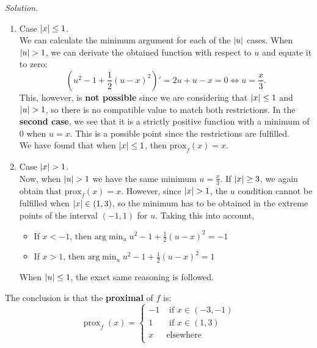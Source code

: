 \documentclass[a4paper]{article}
\DeclarePairedDelimiter\abs{\lvert}{\rvert}%
\newenvironment{solution}
    {\textit{Solution.}\\}
    {}
\begin{document}
\begin{solution}
  \begin{enumerate}
    \item Case \(\abs{x} \leq 1 \).\\

          We can calculate the minimum argument for each of the \(\abs{u}\) cases. When \(\abs{u} > 1\), we can derivate the obtained function with respect to \(u\) and equate it to zero:
          \[
            \left(u^2 - 1 + \frac{1}{2}(u-x)^2\right)' = 2u + u -x = 0 \Longleftrightarrow  u = \frac{x}{3}.
          \]
          This, however, is \textbf{not possible} since we are considering that \(\abs{x} \leq 1\) and \(\abs{u}>1\), so there is no compatible value to match both restrictions. In the \textbf{second case}, we see that it is a strictly positive function with a minimum of \(0\) when \(u = x\). This is a possible point since the restrictions are fulfilled.\\

          We have found that when \(\abs{x} \leq 1\), then \(\text{prox}_f(x) = x\).

    \item Case \(\abs{x} > 1 \).\\

          Now, when \(\abs{u} > 1\) we have the same minimum \(u = \frac{x}{3}\). If \(\abs{x} \geq 3\), we again obtain that \(\text{prox}_f(x) = x\). However, since \(\abs{x} > 1\), the \(u\) condition cannot be fulfilled when \(\abs{x} \in (1,3)\), so the minimum has to be obtained in the extreme points of the interval \((-1,1)\) for \(u\). Taking this into account,
          \begin{itemize}
            \item If \(x < -1\), then \(\text{arg}\min_u u^2 - 1 + \frac{1}{2}(u-x)^2 = -1\)
            \item If \(x > 1\), then \(\text{arg}\min_u u^2 - 1 + \frac{1}{2}(u-x)^2 = 1\)
          \end{itemize}
          When \(\abs{u} \leq 1\), the exact same reasoning is followed.
  \end{enumerate}


  The conclusion is that the \textbf{proximal} of \(f\) is:
  \[
    \operatorname{prox}_f(x) = \begin{cases}
      -1 & \text{ if } x \in (-3,-1) \\
      1  & \text{ if } x \in (1,3)   \\
      x  & \text{elsewhere}          \\
    \end{cases}
  \]
\end{solution}
\end{document}
